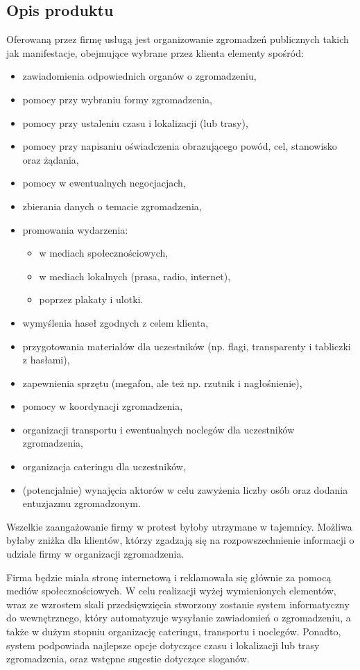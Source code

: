 \documentclass{article}
\begin{document}
\subsection{Opis produktu}
Oferowaną przez firmę usługą jest organizowanie zgromadzeń publicznych takich jak manifestacje, obejmujące wybrane przez klienta elementy spośród:
\begin{itemize}
\item zawiadomienia odpowiednich organów o zgromadzeniu,
\item pomocy przy wybraniu formy zgromadzenia,
\item pomocy przy ustaleniu czasu i lokalizacji (lub trasy),
\item pomocy przy napisaniu oświadczenia obrazującego powód, cel, stanowisko oraz żądania,
\item pomocy w ewentualnych negocjacjach,
\item zbierania danych o temacie zgromadzenia,
\item promowania wydarzenia: 
	\begin{itemize}
	\item w mediach społecznościowych,
	\item w mediach lokalnych (prasa, radio, internet),
	\item poprzez plakaty i ulotki.
	\end{itemize}
\item wymyślenia haseł zgodnych z celem klienta,
\item przygotowania materiałów dla uczestników (np. flagi, transparenty i tabliczki z hasłami),
\item zapewnienia sprzętu (megafon, ale też np. rzutnik i nagłośnienie),
\item pomocy w koordynacji zgromadzenia,
\item organizacji transportu i ewentualnych noclegów dla uczestników zgromadzenia,
\item organizacja cateringu dla uczestników,
\item (potencjalnie) wynajęcia aktorów w celu zawyżenia liczby osób oraz dodania entuzjazmu zgromadzonym.
\end{itemize}
Wszelkie zaangażowanie firmy w protest byłoby utrzymane w tajemnicy. Możliwa byłaby zniżka dla klientów, którzy zgadzają się na rozpowszechnienie informacji o udziale firmy w organizacji zgromadzenia. 

Firma będzie miała stronę internetową i reklamowała się głównie za pomocą mediów społecznościowych. W celu realizacji wyżej wymienionych elementów, wraz ze wzrostem skali przedsięwzięcia stworzony zostanie system informatyczny do wewnętrznego, który automatyzuje wysyłanie zawiadomień o zgromadzeniu, a także w dużym stopniu organizację cateringu, transportu i noclegów. Ponadto, system podpowiada najlepsze opcje dotyczące czasu i lokalizacji lub trasy zgromadzenia, oraz wstępne sugestie dotyczące sloganów.
\end{document}
